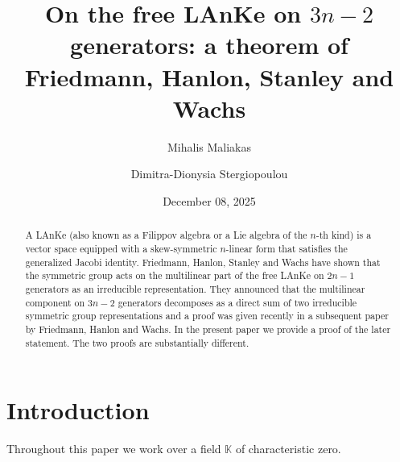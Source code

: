 \documentclass[11pt]{amsart}
\theoremstyle{definition}
\numberwithin{equation}{section}
\begin{document}
\title{On the free LAnKe on $3n-2$ generators: a theorem of Friedmann, Hanlon, Stanley and Wachs}




\author[Maliakas]{Mihalis Maliakas}

\address{%
	Department of Mathematics\\
	University of Athens\\
	Greece}



\author[Stergiopoulou]{Dimitra-Dionysia Stergiopoulou}
\address{Department of Mathematics\\
	University of Athens\\
	Greece}





\date{December 08, 2025}


\begin{abstract}A LAnKe (also known as a Filippov algebra or a Lie algebra of the $n$-th kind) is a vector space equipped with a skew-symmetric $n$-linear form that satisfies the generalized Jacobi identity. Friedmann, Hanlon, Stanley and Wachs have shown that the symmetric group acts on the multilinear part of the free LAnKe on $2n-1$ generators as an irreducible representation. They announced that the multilinear component on $3n-2$ generators decomposes as a direct sum of two irreducible symmetric group representations and a proof was given recently in a subsequent paper by Friedmann, Hanlon and Wachs. In the present paper we provide a proof of the later statement. The two proofs are substantially different.
\end{abstract}

\maketitle

\section{Introduction} Throughout this paper we work over a field $\mathbb{K}$ of characteristic zero. 
\end{document}

